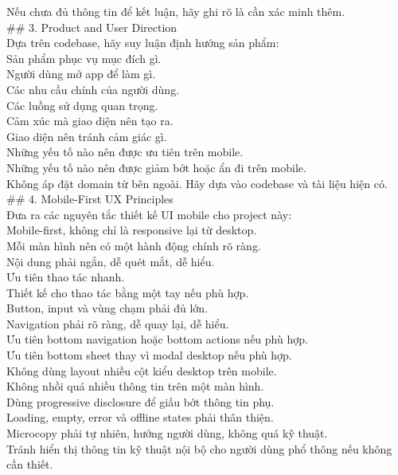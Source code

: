 \begin{enumerate}
Nếu chưa đủ thông tin để kết luận, hãy ghi rõ là cần xác minh thêm. \\

\#\# 3. Product and User Direction \\

Dựa trên codebase, hãy suy luận định hướng sản phẩm: \\
\* Sản phẩm phục vụ mục đích gì. \\
\* Người dùng mở app để làm gì. \\
\* Các nhu cầu chính của người dùng. \\
\* Các luồng sử dụng quan trọng. \\
\* Cảm xúc mà giao diện nên tạo ra. \\
\* Giao diện nên tránh cảm giác gì. \\
\* Những yếu tố nào nên được ưu tiên trên mobile. \\
\* Những yếu tố nào nên được giảm bớt hoặc ẩn đi trên mobile. \\


Không áp đặt domain từ bên ngoài. Hãy dựa vào codebase và tài liệu hiện có. \\

\#\# 4. Mobile-First UX Principles \\

Đưa ra các nguyên tắc thiết kế UI mobile cho project này: \\
\* Mobile-first, không chỉ là responsive lại từ desktop. \\
\* Mỗi màn hình nên có một hành động chính rõ ràng. \\
\* Nội dung phải ngắn, dễ quét mắt, dễ hiểu. \\
\* Ưu tiên thao tác nhanh. \\
\* Thiết kế cho thao tác bằng một tay nếu phù hợp. \\
\* Button, input và vùng chạm phải đủ lớn. \\
\* Navigation phải rõ ràng, dễ quay lại, dễ hiểu. \\
\* Ưu tiên bottom navigation hoặc bottom actions nếu phù hợp. \\
\* Ưu tiên bottom sheet thay vì modal desktop nếu phù hợp. \\
\* Không dùng layout nhiều cột kiểu desktop trên mobile. \\
\* Không nhồi quá nhiều thông tin trên một màn hình. \\
\* Dùng progressive disclosure để giấu bớt thông tin phụ. \\
\* Loading, empty, error và offline states phải thân thiện. \\
\* Microcopy phải tự nhiên, hướng người dùng, không quá kỹ thuật. \\
\* Tránh hiển thị thông tin kỹ thuật nội bộ cho người dùng phổ thông nếu không cần thiết. \\



\end{enumerate}
